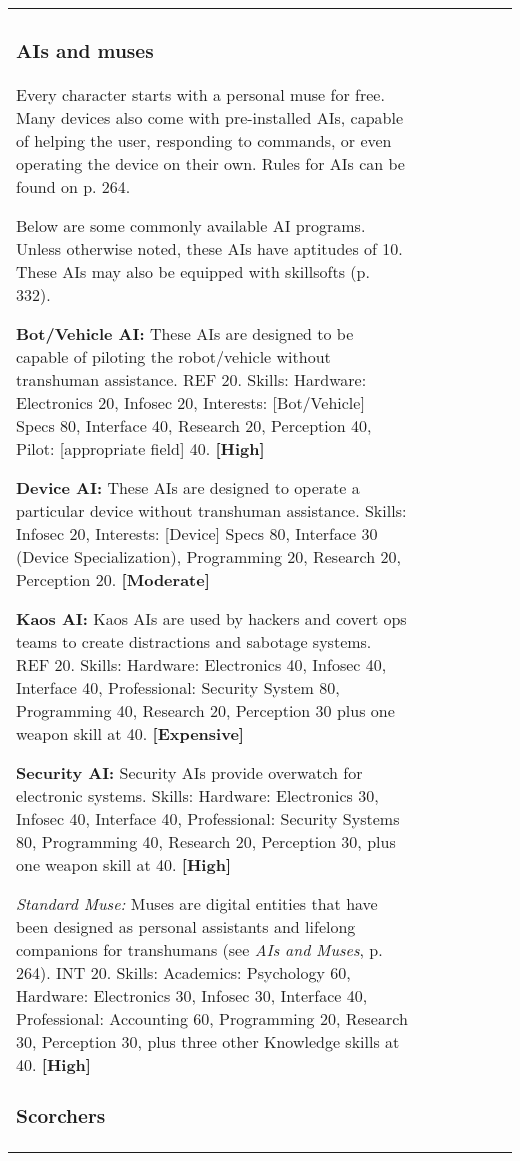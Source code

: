 \begin{tabular}{|l|l|l|l|l|l|l|}
\subsubsection{AIs and muses} 

Every character starts with a personal muse for free. Many devices also come with pre-installed AIs, capable of helping the user, responding to commands, or even operating the device on their own. Rules for AIs can be found on p. 264. 

Below are some commonly available AI programs. Unless otherwise noted, these AIs have aptitudes of 10. These AIs may also be equipped with skillsofts (p. 332). 

\textbf{Bot/Vehicle AI:} These AIs are designed to be capable of piloting the robot/vehicle without transhuman assistance. REF 20. Skills: Hardware: Electronics 20, Infosec 20, Interests: [Bot/Vehicle] Specs 80, Interface 40, Research 20, Perception 40, Pilot: [appropriate field] 40. \textbf{[High]} 

\textbf{Device AI:} These AIs are designed to operate a particular device without transhuman assistance. Skills: Infosec 20, Interests: [Device] Specs 80, Interface 30 (Device Specialization), Programming 20, Research 20, Perception 20. \textbf{[Moderate]} 

\textbf{Kaos AI:} Kaos AIs are used by hackers and covert ops teams to create distractions and sabotage systems. REF 20. Skills: Hardware: Electronics 40, Infosec 40, Interface 40, Professional: Security System 80, Programming 40, Research 20, Perception 30 plus one weapon skill at 40. \textbf{[Expensive]} 

\textbf{Security AI:} Security AIs provide overwatch for electronic systems. Skills: Hardware: Electronics 30, Infosec 40, Interface 40, Professional: Security Systems 80, Programming 40, Research 20, Perception 30, plus one weapon skill at 40. \textbf{[High]} 

\emph{Standard Muse:} Muses are digital entities that have been designed as personal assistants and lifelong companions for transhumans (see \emph{AIs and Muses}, p. 264). INT 20. Skills: Academics: Psychology 60, Hardware: Electronics 30, Infosec 30, Interface 40, Professional: Accounting 60, Programming 20, Research 30, Perception 30, plus three other Knowledge skills at 40. \textbf{[High]} 

\subsubsection{Scorchers} 


\end{tabular}
